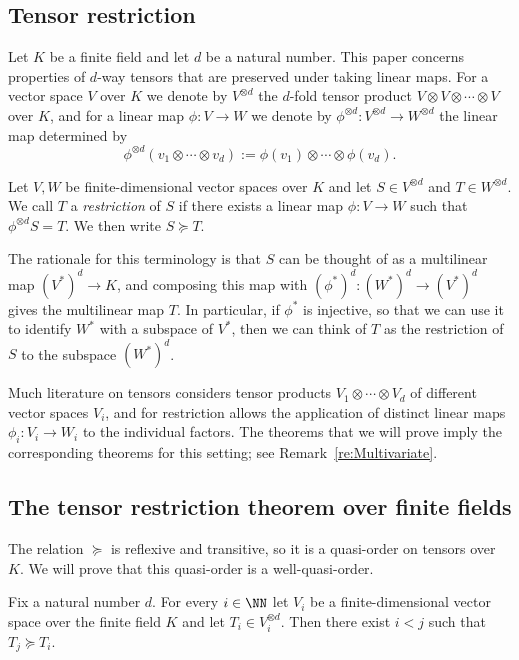 \documentclass{amsart}
\begin{document}
\subsection{Tensor restriction}

Let $K$ be a finite field and let $d$ be a natural number. This paper
concerns properties of $d$-way tensors that are preserved under taking
linear maps. For a vector space $V$ over $K$ we denote by $V^{\otimes d}$ 
the $d$-fold tensor product $V \otimes V \otimes \cdots \otimes V$ over
$K$, and for a linear map $\phi:V \to W$ we denote by $\phi^{\otimes
d}:V^{\otimes d} \to W^{\otimes d}$ the linear map determined by
\[ \phi^{\otimes d}(v_1 \otimes \cdots \otimes
v_d):=\phi(v_1) \otimes \cdots \otimes \phi(v_d). \]

\begin{de}
Let $V,W$ be finite-dimensional vector spaces over $K$ and let $S
\in V^{\otimes d}$ and $T \in W^{\otimes d}$. We call $T$ a {\em
restriction} of $S$ if there exists a linear map $\phi:V \to W$ such that
$\phi^{\otimes d} S = T$. We then write $S \succeq T$.
\end{de}

The rationale for this terminology is that $S$ can be thought of
as a multilinear map $(V^*)^d \to K$, and composing this 
map with $(\phi^*)^d:(W^*)^d \to (V^*)^d$ gives the multilinear map
$T$. In particular, if $\phi^*$ is injective, so that we can use it to
identify $W^*$ with a subspace of $V^*$, then we can think of $T$ as
the restriction of $S$ to the subspace $(W^*)^d$. 

\begin{re} \label{re:Tensors}
Much literature on tensors considers tensor products $V_1 \otimes \cdots
\otimes V_d$ of different vector spaces $V_i$, and for restriction
allows the application of distinct linear maps $\phi_i: V_i \to W_i$
to the individual factors. The theorems that we will prove imply the
corresponding theorems for this setting; see
Remark~\ref{re:Multivariate}.
\end{re}

\subsection{The tensor restriction theorem over finite fields}

The relation $\succeq$ is reflexive and transitive, so it
is a quasi-order on tensors over $K$. We will prove that 
this quasi-order is a well-quasi-order.

\begin{thm}
\label{thm:TensorRestriction}
Fix a natural number $d$. For every $i \in \NN$ let $V_i$ be a
finite-dimensional vector space over the finite field $K$ and let $T_i
\in V_i^{\otimes d}$. Then there exist $i<j$ such that $T_j \succeq T_i$.
\end{thm}
\end{document}
